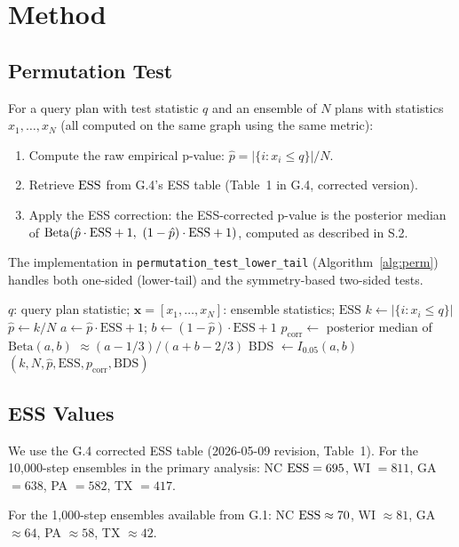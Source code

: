 \section{Method}

\subsection{Permutation Test}

For a query plan with test statistic $q$ and an ensemble of $N$ plans with
statistics $x_1, \ldots, x_N$ (all computed on the same graph using the same metric):

\begin{enumerate}
  \item Compute the raw empirical p-value:
    $\hat{p} = |\{i : x_i \leq q\}| / N$.
  \item Retrieve $\mathrm{ESS}$ from G.4's ESS table (Table~1 in G.4, corrected version).
  \item Apply the ESS correction: the ESS-corrected p-value is the posterior
    median of $\mathrm{Beta}(\hat{p} \cdot \mathrm{ESS} + 1,\ (1-\hat{p}) \cdot \mathrm{ESS} + 1)$,
    computed as described in S.2.
\end{enumerate}

The implementation in \texttt{permutation\_test\_lower\_tail} (Algorithm~\ref{alg:perm})
handles both one-sided (lower-tail) and the symmetry-based two-sided tests.

\begin{algorithm}
\caption{ESS-corrected permutation test}
\label{alg:perm}
\begin{algorithmic}[1]
\Require $q$: query plan statistic; $\mathbf{x} = [x_1,\ldots,x_N]$: ensemble statistics; $\mathrm{ESS}$
\State $k \leftarrow |\{i : x_i \leq q\}|$
\State $\hat{p} \leftarrow k/N$
\State $a \leftarrow \hat{p} \cdot \mathrm{ESS} + 1$; $b \leftarrow (1-\hat{p}) \cdot \mathrm{ESS} + 1$
\State $p_{\mathrm{corr}} \leftarrow$ posterior median of $\mathrm{Beta}(a, b)$ $\approx (a-1/3)/(a+b-2/3)$
\State BDS $\leftarrow I_{0.05}(a, b)$ 
\State \Return $(k, N, \hat{p}, \mathrm{ESS}, p_{\mathrm{corr}}, \mathrm{BDS})$
\end{algorithmic}
\end{algorithm}

\subsection{ESS Values}

We use the G.4 corrected ESS table (2026-05-09 revision, Table~1).
For the 10{,}000-step ensembles in the primary analysis:
NC $\mathrm{ESS} = 695$, WI $= 811$, GA $= 638$, PA $= 582$, TX $= 417$.

For the 1{,}000-step ensembles available from G.1:
NC $\mathrm{ESS} \approx 70$, WI $\approx 81$, GA $\approx 64$, PA $\approx 58$, TX $\approx 42$.
